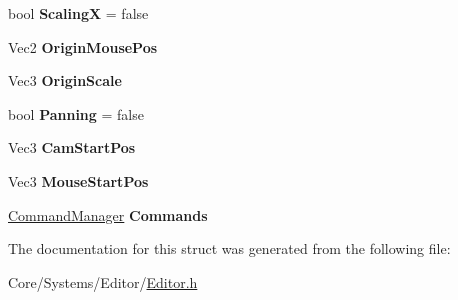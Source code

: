 \begin{DoxyCompactItemize}
\item 
\hypertarget{structDCEngine_1_1EditorConfig_ab3d54e6e035035a882b1d64aaf95af90}{bool {\bfseries Scaling\-X} = false}\label{structDCEngine_1_1EditorConfig_ab3d54e6e035035a882b1d64aaf95af90}

\item 
\hypertarget{structDCEngine_1_1EditorConfig_abb3666511134d6813b918ac0fe5100fd}{Vec2 {\bfseries Origin\-Mouse\-Pos}}\label{structDCEngine_1_1EditorConfig_abb3666511134d6813b918ac0fe5100fd}

\item 
\hypertarget{structDCEngine_1_1EditorConfig_ab2c7a53f20a47ab847d30951949f4877}{Vec3 {\bfseries Origin\-Scale}}\label{structDCEngine_1_1EditorConfig_ab2c7a53f20a47ab847d30951949f4877}

\item 
\hypertarget{structDCEngine_1_1EditorConfig_a7312fe41c1c722bbce1e5e18875ee573}{bool {\bfseries Panning} = false}\label{structDCEngine_1_1EditorConfig_a7312fe41c1c722bbce1e5e18875ee573}

\item 
\hypertarget{structDCEngine_1_1EditorConfig_a0f695e3d5254e8f1ffab3839671a99b5}{Vec3 {\bfseries Cam\-Start\-Pos}}\label{structDCEngine_1_1EditorConfig_a0f695e3d5254e8f1ffab3839671a99b5}

\item 
\hypertarget{structDCEngine_1_1EditorConfig_abc4d61c9427a470148845ef3b4ddff10}{Vec3 {\bfseries Mouse\-Start\-Pos}}\label{structDCEngine_1_1EditorConfig_abc4d61c9427a470148845ef3b4ddff10}

\item 
\hypertarget{structDCEngine_1_1EditorConfig_a7b6dbf5829f25aef1e6335e47481737b}{\hyperlink{classDCEngine_1_1CommandManager}{Command\-Manager} {\bfseries Commands}}\label{structDCEngine_1_1EditorConfig_a7b6dbf5829f25aef1e6335e47481737b}

\end{DoxyCompactItemize}


The documentation for this struct was generated from the following file\-:\begin{DoxyCompactItemize}
\item 
Core/\-Systems/\-Editor/\hyperlink{Editor_8h}{Editor.\-h}\end{DoxyCompactItemize}
